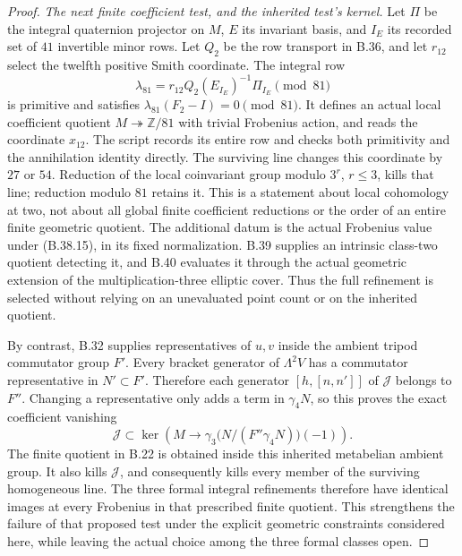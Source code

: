 \begin{proof}
\emph{The next finite coefficient test, and the inherited test's kernel.}
Let $\Pi$ be the integral quaternion projector on $M$,
$E$ its invariant basis, and $I_E$ its recorded set of
$41$ invertible minor rows. Let $Q_2$ be the row
transport in B.36, and let $r_{12}$ select the twelfth
positive Smith coordinate. The integral row
\[
 \lambda_{81}
     =r_{12}Q_2(E_{I_E})^{-1}\Pi_{I_E}\pmod{81}              \tag{B.38.15}
\]
is primitive and satisfies
$\lambda_{81}(F_2-I)=0\pmod{81}$.
It defines an actual local coefficient quotient
$M\twoheadrightarrow\mathbb Z/81$ with trivial
Frobenius action, and reads the coordinate $x_{12}$.
The script records its entire row and checks both
primitivity and the annihilation identity directly.
The surviving line changes this coordinate by
$27$ or $54$. Reduction of the local coinvariant
group modulo $3^r$, $r\le3$, kills that line; reduction
modulo $81$ retains it. This is a statement about
local cohomology at two, not about all global finite
coefficient reductions or the order of an entire
finite geometric quotient.
The additional datum is the actual Frobenius value under
(B.38.15), in its fixed normalization. B.39 supplies an
intrinsic class-two quotient detecting it, and B.40
evaluates it through the actual geometric extension of
the multiplication-three elliptic cover. Thus the full
refinement is selected without relying on an unevaluated
point count or on the inherited quotient.

By contrast, B.32 supplies representatives of $u,v$
inside the ambient tripod commutator group $F'$.
Every bracket generator of $\Lambda^2V$ has a commutator
representative in $N'\subset F'$.
Therefore each generator $[h,[n,n']]$ of $\mathcal J$
belongs to $F''$.
Changing a representative only adds a term in
$\gamma_4N$, so this proves the exact coefficient
vanishing
\[
 \mathcal J\subset\ker\left(
 M\longrightarrow
 \gamma_3\bigl(N/(F''\gamma_4N)\bigr)(-1)\right).             \tag{B.38.16}
\]
The finite quotient in B.22 is obtained inside this
inherited metabelian ambient group. It also kills
$\mathcal J$, and consequently kills every member
of the surviving homogeneous line.
The three formal integral refinements therefore
have identical images at every Frobenius in that
prescribed finite quotient. This strengthens the
failure of that proposed test under the explicit
geometric constraints considered here, while
leaving the actual choice among the three formal
classes open.
\end{proof}
